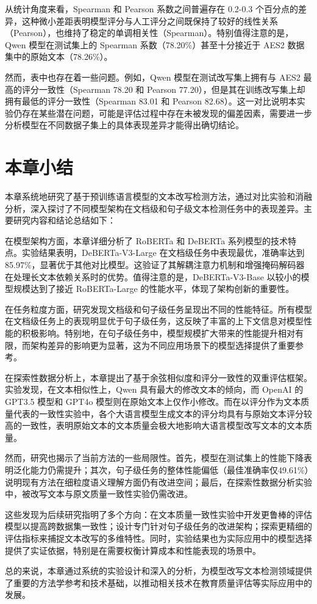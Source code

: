 从统计角度来看，Spearman 和 Pearson 系数之间普遍存在 0.2-0.3 个百分点的差异，这种微小差距表明模型评分与人工评分之间既保持了较好的线性关系（Pearson），也维持了稳定的单调相关性（Spearman）。特别值得注意的是，Qwen 模型在测试集上的 Spearman 系数（78.20\%）甚至十分接近于 AES2 数据集中的原始文本（78.26\%）。

然而，表中也存在着一些问题。例如，Qwen 模型在测试改写集上拥有与 AES2 最高的评分一致性（Spearman 78.20 和 Pearson 77.20），但是其在训练改写集上却拥有最低的评分一致性（Spearman 83.01 和 Pearson 82.68）。这一对比说明本实验仍存在某些潜在问题，可能是评估过程中存在未被发现的偏差因素，需要进一步分析模型在不同数据子集上的具体表现差异才能得出确切结论。

\section{本章小结}
\label{sec:method-conclusion}

本章系统地研究了基于预训练语言模型的文本改写检测方法，通过对比实验和消融分析，深入探讨了不同模型架构在文档级和句子级文本检测任务中的表现差异。主要研究内容和结论总结如下：

在模型架构方面，本章详细分析了 RoBERTa 和 DeBERTa 系列模型的技术特点。实验结果表明，DeBERTa-V3-Large 在文档级任务中表现最优，准确率达到 85.97\%，显著优于其他对比模型。这验证了其解耦注意力机制和增强掩码解码器在处理长文本依赖关系时的优势。值得注意的是，DeBERTa-V3-Base 以较小的模型规模达到了接近 RoBERTa-Large 的性能水平，体现了架构创新的重要性。

在任务粒度方面，研究发现文档级和句子级任务呈现出不同的性能特征。所有模型在文档级任务上的表现明显优于句子级任务，这反映了丰富的上下文信息对模型性能的积极影响。特别地，在句子级任务中，模型规模扩大带来的性能提升相对有限，而架构差异的影响更为显著，这为不同应用场景下的模型选择提供了重要参考。

在探索性数据分析上，本章提出了基于余弦相似度和评分一致性的双重评估框架。实验发现，在文本相似性上，Qwen 具有最大的修改文本的倾向，而 OpenAI 的 GPT3.5 模型和 GPT4o 模型则在原始文本上仅作小修改。而在以评分作为文本质量代表的一致性实验中，各个大语言模型生成文本的评分均具有与原始文本评分较高的一致性，表明原始文本的文本质量会极大地影响大语言模型改写文本的文本质量。

然而，研究也揭示了当前方法的一些局限性。首先，模型在测试集上的性能下降表明泛化能力仍需提升；其次，句子级任务的整体性能偏低（最佳准确率仅49.61\%）说明现有方法在细粒度语义理解方面仍有改进空间；最后，在探索性数据分析实验中，被改写文本与原文质量一致性实验仍需改进。

这些发现为后续研究指明了多个方向：在文本质量一致性实验中开发更鲁棒的评估模型以提高跨数据集一致性；设计专门针对句子级任务的改进架构；探索更精细的评估指标来捕捉文本改写的多维特性。同时，实验结果也为实际应用中的模型选择提供了实证依据，特别是在需要权衡计算成本和性能表现的场景中。

总的来说，本章通过系统的实验设计和深入的分析，为模型改写文本检测领域提供了重要的方法学参考和技术基础，以推动相关技术在教育质量评估等实际应用中的发展。